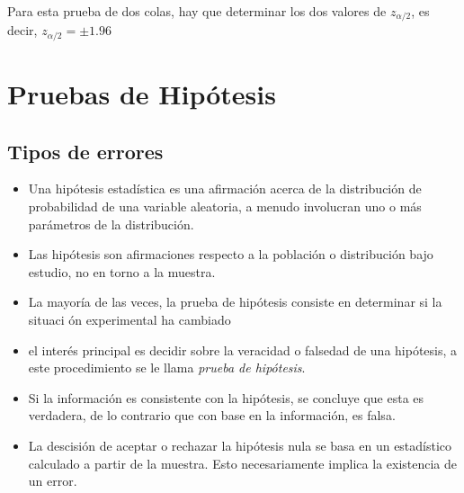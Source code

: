 \begin{Sol}
Para esta prueba de  dos colas, hay que determinar los dos valores de $z_{\alpha/2}$, es decir, $z_{\alpha/2}=\pm1.96$

\end{Sol}





\section{Pruebas de Hip\'otesis}
\subsection{Tipos de errores}





\begin{itemize}
\item Una hip\'otesis estad\'istica es una afirmaci\'on  acerca de la distribuci\'on de probabilidad de una variable aleatoria, a menudo involucran uno o m\'as par\'ametros de la distribuci\'on.

\item Las hip\'otesis son afirmaciones respecto a la poblaci\'on o distribuci\'on bajo estudio, no en torno a la muestra.

\item La mayor\'ia de las veces, la prueba de hip\'otesis consiste en determinar si la situaci \'on experimental ha cambiado

\item el inter\'es principal es decidir sobre la veracidad o falsedad de una hip\'otesis, a este procedimiento se le llama \textit{prueba de hip\'otesis}.

\item Si la informaci\'on es consistente con la hip\'otesis, se concluye que esta es verdadera, de lo contrario que con base en la informaci\'on, es falsa.

\end{itemize}










\begin{itemize}
\item La descisi\'on de aceptar o rechazar la hip\'otesis nula se basa en un estad\'istico calculado a partir de la muestra. Esto necesariamente implica la existencia de un error.


\end{itemize}



